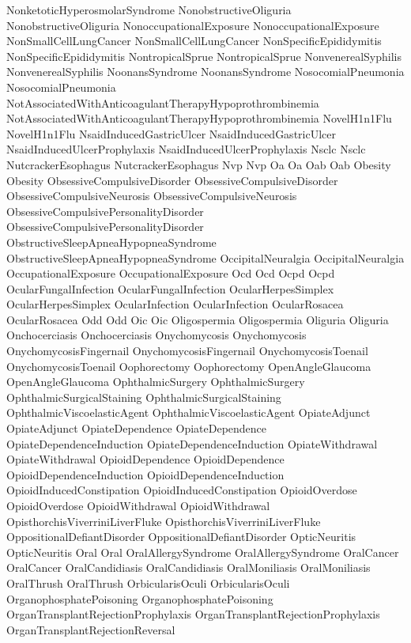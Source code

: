  NonketoticHyperosmolarSyndrome
 NonobstructiveOliguria
 NonobstructiveOliguria
 NonoccupationalExposure
 NonoccupationalExposure
 NonSmallCellLungCancer
 NonSmallCellLungCancer
 NonSpecificEpididymitis
 NonSpecificEpididymitis
 NontropicalSprue
 NontropicalSprue
 NonvenerealSyphilis
 NonvenerealSyphilis
 NoonansSyndrome
 NoonansSyndrome
 NosocomialPneumonia
 NosocomialPneumonia
 NotAssociatedWithAnticoagulantTherapyHypoprothrombinemia
 NotAssociatedWithAnticoagulantTherapyHypoprothrombinemia
 NovelH1n1Flu
 NovelH1n1Flu
 NsaidInducedGastricUlcer
 NsaidInducedGastricUlcer
 NsaidInducedUlcerProphylaxis
 NsaidInducedUlcerProphylaxis
 Nsclc
 Nsclc
 NutcrackerEsophagus
 NutcrackerEsophagus
 Nvp
 Nvp
 Oa
 Oa
 Oab
 Oab
 Obesity
 Obesity
 ObsessiveCompulsiveDisorder
 ObsessiveCompulsiveDisorder
 ObsessiveCompulsiveNeurosis
 ObsessiveCompulsiveNeurosis
 ObsessiveCompulsivePersonalityDisorder
 ObsessiveCompulsivePersonalityDisorder
 ObstructiveSleepApneaHypopneaSyndrome
 ObstructiveSleepApneaHypopneaSyndrome
 OccipitalNeuralgia
 OccipitalNeuralgia
 OccupationalExposure
 OccupationalExposure
 Ocd
 Ocd
 Ocpd
 Ocpd
 OcularFungalInfection
 OcularFungalInfection
 OcularHerpesSimplex
 OcularHerpesSimplex
 OcularInfection
 OcularInfection
 OcularRosacea
 OcularRosacea
 Odd
 Odd
 Oic
 Oic
 Oligospermia
 Oligospermia
 Oliguria
 Oliguria
 Onchocerciasis
 Onchocerciasis
 Onychomycosis
 Onychomycosis
 OnychomycosisFingernail
 OnychomycosisFingernail
 OnychomycosisToenail
 OnychomycosisToenail
 Oophorectomy
 Oophorectomy
 OpenAngleGlaucoma
 OpenAngleGlaucoma
 OphthalmicSurgery
 OphthalmicSurgery
 OphthalmicSurgicalStaining
 OphthalmicSurgicalStaining
 OphthalmicViscoelasticAgent
 OphthalmicViscoelasticAgent
 OpiateAdjunct
 OpiateAdjunct
 OpiateDependence
 OpiateDependence
 OpiateDependenceInduction
 OpiateDependenceInduction
 OpiateWithdrawal
 OpiateWithdrawal
 OpioidDependence
 OpioidDependence
 OpioidDependenceInduction
 OpioidDependenceInduction
 OpioidInducedConstipation
 OpioidInducedConstipation
 OpioidOverdose
 OpioidOverdose
 OpioidWithdrawal
 OpioidWithdrawal
 OpisthorchisViverriniLiverFluke
 OpisthorchisViverriniLiverFluke
 OppositionalDefiantDisorder
 OppositionalDefiantDisorder
 OpticNeuritis
 OpticNeuritis
 Oral
 Oral
 OralAllergySyndrome
 OralAllergySyndrome
 OralCancer
 OralCancer
 OralCandidiasis
 OralCandidiasis
 OralMoniliasis
 OralMoniliasis
 OralThrush
 OralThrush
 OrbicularisOculi
 OrbicularisOculi
 OrganophosphatePoisoning
 OrganophosphatePoisoning
 OrganTransplantRejectionProphylaxis
 OrganTransplantRejectionProphylaxis
 OrganTransplantRejectionReversal
